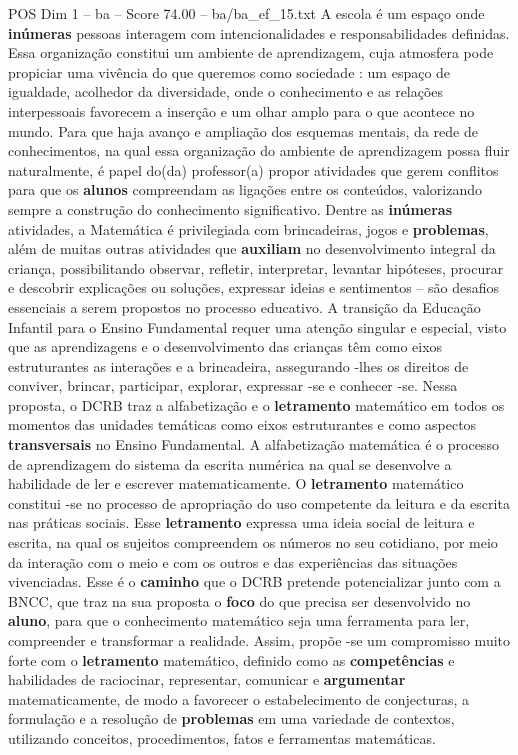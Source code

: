 \begin{textsample}{POS Dim 1 – ba – Score 74.00 – ba/ba\_ef\_15.txt}
A escola é um espaço onde \textbf{inúmeras} pessoas interagem com intencionalidades e responsabilidades definidas.
Essa organização constitui um ambiente de aprendizagem, cuja atmosfera pode propiciar uma vivência do que queremos como sociedade : um espaço de igualdade, acolhedor da diversidade, onde o conhecimento e as relações interpessoais favorecem a inserção e um olhar amplo para o que acontece no mundo.
Para que haja avanço e ampliação dos esquemas mentais, da rede de conhecimentos, na qual essa organização do ambiente de aprendizagem possa fluir naturalmente, é papel do(da) professor(a) propor atividades que gerem conflitos para que os \textbf{alunos} compreendam as ligações entre os conteúdos, valorizando sempre a construção do conhecimento significativo.
Dentre as \textbf{inúmeras} atividades, a Matemática é privilegiada com brincadeiras, jogos e \textbf{problemas}, além de muitas outras atividades que \textbf{auxiliam} no desenvolvimento integral da criança, possibilitando observar, refletir, interpretar, levantar hipóteses, procurar e descobrir explicações ou soluções, expressar ideias e sentimentos – são desafios essenciais a serem propostos no processo educativo.
A transição da Educação Infantil para o Ensino Fundamental requer uma atenção singular e especial, visto que as aprendizagens e o desenvolvimento das crianças têm como eixos estruturantes as interações e a brincadeira, assegurando -lhes os direitos de conviver, brincar, participar, explorar, expressar -se e conhecer -se.
Nessa proposta, o DCRB traz a alfabetização e o \textbf{letramento} matemático em todos os momentos das unidades temáticas como eixos estruturantes e como aspectos \textbf{transversais} no Ensino Fundamental.
A alfabetização matemática é o processo de aprendizagem do sistema da escrita numérica na qual se desenvolve a habilidade de ler e escrever matematicamente.
O \textbf{letramento} matemático constitui -se no processo de apropriação do uso competente da leitura e da escrita nas práticas sociais.
Esse \textbf{letramento} expressa uma ideia social de leitura e escrita, na qual os sujeitos compreendem os números no seu cotidiano, por meio da interação com o meio e com os outros e das experiências das situações vivenciadas.
Esse é o \textbf{caminho} que o DCRB pretende potencializar junto com a BNCC, que traz na sua proposta o \textbf{foco} do que precisa ser desenvolvido no \textbf{aluno}, para que o conhecimento matemático seja uma ferramenta para ler, compreender e transformar a realidade.
Assim, propõe -se um compromisso muito forte com o \textbf{letramento} matemático, definido como as \textbf{competências} e habilidades de raciocinar, representar, comunicar e \textbf{argumentar} matematicamente, de modo a favorecer o estabelecimento de conjecturas, a formulação e a resolução de \textbf{problemas} em uma variedade de contextos, utilizando conceitos, procedimentos, fatos e ferramentas matemáticas.

\end{textsample}
